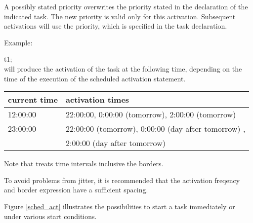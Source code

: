 A possibly stated priority overwrites the priority stated in the
declaration of the indicated task. 
The new priority is valid only 
for this activation. Subsequent activations will use the priority, which
is specified in the task declaration.

Example:

 t1;\\
will produce the activation of the task  at the following time, 
depending on the time of the execution of the scheduled activation statement.

\begin{tabular}{l|l}
current time & activation times \\
\hline
12:00:00 & 22:00:00, 0:00:00 (tomorrow), 2:00:00 (tomorrow) \\
23:00:00 & 22:00:00 (tomorrow), 0:00:00 (day after tomorrow) ,\\
  &  2:00:00 (day after tomorrow) \\ 
\end{tabular}

Note that \OpenPEARL{} treats time intervals inclusive the borders.

To avoid problems from jitter, it is recommended that the 
activation freqency and border expression have a sufficient spacing.

Figure \ref{sched_act} illustrates the possibilities to start a task
immediately or under various start conditions.

